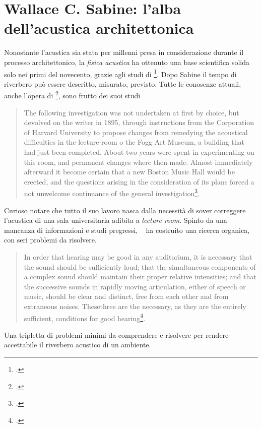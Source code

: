 \section{Wallace C. Sabine: l'alba dell'acustica architettonica}

\bigskip

Nonostante l'acustica sia stata per millenni presa in considerazione durante il processo 
architettonico, la \emph{fisica acustica} ha ottenuto
una base scientifica solida solo nei primi del novecento, grazie agli studi di 
\ws\footcite{ws:rev}. 
Dopo Sabine il tempo di riverbero può essere descritto, misurato, previsto.
Tutte le conosenze attuali, anche l'opera di \ms\footcite{ms:rev62, ms:rev64}, 
sono frutto dei suoi studi

\begin{quote}
  The following investigation was not undertaken at first by choice, but devolved
  on the writer in 1895, through instructions from the Corporation of Harvard
  University to propose changes from remedying the acoustical difficulties in
  the lecture-room o the Fogg Art Museum, a building that had just been completed.
  About two years were spent in experimenting on this room, and permanent changes
  where then made. Almost immediately afterward it become certain that a new
  Boston Music Hall would be erected, and the questions arising in the
  consideration of its plans forced a not unwelcome continuance of the general
  investigation\footcite{ws:rev}.
\end{quote}

Curioso notare che tutto il suo lavoro nasca dalla necessità di sover correggere
l'acustica di una sala universitaria adibita a \emph{lecture room}.
Spinto da una mancanza di informazioni e studi pregressi, \ms~ ha costruito una 
ricerca organica, con seri
problemi da risolvere.

\begin{quote}
  In order that hearing may be good in any auditorium, it is necessary that the
  sound should be sufficiently loud; that the simultaneous components of a
  complex sound should maintain their proper relative intensities;
  and that the successive sounds in rapidly moving articulation, either of speech
  or music, should be clear and distinct, free from each other and from extraneous
  noises. Thesethree are the necessary, as they are the entirely sufficient,
  conditions for good hearing\footcite{ws:rev}.
\end{quote}

Una tripletta di problemi minimi da comprendere e risolvere per rendere accettabile
il riverbero acustico di un ambiente.

